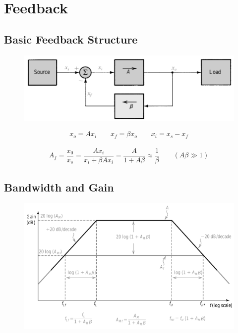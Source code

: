 \chapter{Feedback}

\section{Basic Feedback Structure}

\begin{figure}[H]
  \centering
  \includegraphics[width=0.9\linewidth]{figures/Basic-Feedback-Structure}
\end{figure}

\begin{equation*}
  \begin{aligned}
    x_o = A x_i \quad\quad x_f = \beta x_o \quad\quad x_i = x_s - x_f
  \end{aligned}
\end{equation*}

\begin{equation*}
  \begin{aligned}
    A_f = \dfrac{x_0}{x_s}  = \dfrac{A x_i}{x_i + \beta A x_i } = \dfrac{A}{1 + A \beta} \approx \dfrac{1}{\beta}  \quad\quad \left( A\beta \gg 1 \right)
  \end{aligned}
\end{equation*}

\section{Bandwidth and Gain}

\begin{figure}[H]
  \centering
  \includegraphics[width=0.6\linewidth]{figures/Feedback-Bandwidth}
  \label{fig:}
\end{figure}

